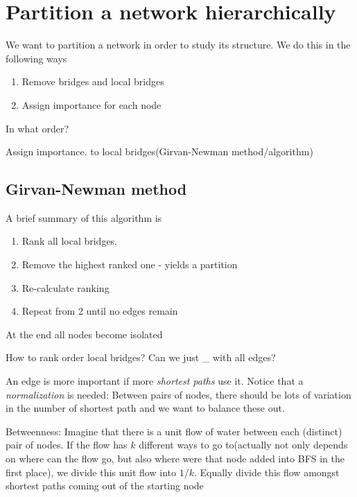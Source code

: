 \section{Partition a network hierarchically}
We want to partition a network in order to study its structure. We do this in the following ways
\begin{enumerate}
	\item Remove bridges and local bridges
	\item Assign importance for each node
\end{enumerate}

\begin{problem}
In what order?
\end{problem}
\begin{answer}
	Assign importance. to local bridges(Girvan-Newman method/algorithm)
\end{answer}

\subsection{Girvan-Newman method}
\begin{intuition}
	A brief summary of this algorithm is
	\begin{enumerate}
		\item Rank all local bridges.
		\item Remove the highest ranked one - yields a partition
		\item Re-calculate ranking
		\item Repeat from 2 until no edges remain
	\end{enumerate}
\end{intuition}

At the end all nodes become isolated

\begin{problem}
How to rank order local bridges? Can we just \_ with all edges?
\end{problem}

\begin{intuition}
	An edge is more important if more \emph{shortest paths} use it. Notice that a \emph{normalization} is needed:
	Between pairs of nodes, there should be lots of variation in the number of shortest path and we want to balance these out.
\end{intuition}

\begin{definition}
	Betweenness: Imagine that there is a unit flow of water between each (distinct) pair of nodes. If the flow has $k$ different ways
	to go to(actually not only depends on where can the flow go, but also where were that node added into BFS in the first place), we divide this unit flow into $1/k$.
	Equally divide this flow amongst shortest paths coming out of the starting node
\end{definition}

